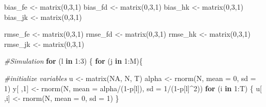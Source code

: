 \documentclass[
]{article}
\newenvironment{Shaded}{\begin{snugshade}}{\end{snugshade}}
\newcommand{\AttributeTok}[1]{\textcolor[rgb]{0.77,0.63,0.00}{#1}}
\newcommand{\CommentTok}[1]{\textcolor[rgb]{0.56,0.35,0.01}{\textit{#1}}}
\newcommand{\ConstantTok}[1]{\textcolor[rgb]{0.00,0.00,0.00}{#1}}
\newcommand{\ControlFlowTok}[1]{\textcolor[rgb]{0.13,0.29,0.53}{\textbf{#1}}}
\newcommand{\DecValTok}[1]{\textcolor[rgb]{0.00,0.00,0.81}{#1}}
\newcommand{\FunctionTok}[1]{\textcolor[rgb]{0.00,0.00,0.00}{#1}}
\newcommand{\NormalTok}[1]{#1}
\newcommand{\OtherTok}[1]{\textcolor[rgb]{0.56,0.35,0.01}{#1}}
\newcommand{\SpecialCharTok}[1]{\textcolor[rgb]{0.00,0.00,0.00}{#1}}
\begin{document}
\begin{Shaded}
\begin{Highlighting}[]
\NormalTok{bias\_fe }\OtherTok{\textless{}{-}} \FunctionTok{matrix}\NormalTok{(}\DecValTok{0}\NormalTok{,}\DecValTok{3}\NormalTok{,}\DecValTok{1}\NormalTok{)}
\NormalTok{bias\_fd }\OtherTok{\textless{}{-}} \FunctionTok{matrix}\NormalTok{(}\DecValTok{0}\NormalTok{,}\DecValTok{3}\NormalTok{,}\DecValTok{1}\NormalTok{)}
\NormalTok{bias\_hk }\OtherTok{\textless{}{-}} \FunctionTok{matrix}\NormalTok{(}\DecValTok{0}\NormalTok{,}\DecValTok{3}\NormalTok{,}\DecValTok{1}\NormalTok{)}
\NormalTok{bias\_jk }\OtherTok{\textless{}{-}} \FunctionTok{matrix}\NormalTok{(}\DecValTok{0}\NormalTok{,}\DecValTok{3}\NormalTok{,}\DecValTok{1}\NormalTok{)}

\NormalTok{rmse\_fe }\OtherTok{\textless{}{-}} \FunctionTok{matrix}\NormalTok{(}\DecValTok{0}\NormalTok{,}\DecValTok{3}\NormalTok{,}\DecValTok{1}\NormalTok{)}
\NormalTok{rmse\_fd }\OtherTok{\textless{}{-}} \FunctionTok{matrix}\NormalTok{(}\DecValTok{0}\NormalTok{,}\DecValTok{3}\NormalTok{,}\DecValTok{1}\NormalTok{)}
\NormalTok{rmse\_hk }\OtherTok{\textless{}{-}} \FunctionTok{matrix}\NormalTok{(}\DecValTok{0}\NormalTok{,}\DecValTok{3}\NormalTok{,}\DecValTok{1}\NormalTok{)}
\NormalTok{rmse\_jk }\OtherTok{\textless{}{-}} \FunctionTok{matrix}\NormalTok{(}\DecValTok{0}\NormalTok{,}\DecValTok{3}\NormalTok{,}\DecValTok{1}\NormalTok{)}

\CommentTok{\#Simulation}
\ControlFlowTok{for}\NormalTok{ (l }\ControlFlowTok{in} \DecValTok{1}\SpecialCharTok{:}\DecValTok{3}\NormalTok{) \{}
  \ControlFlowTok{for}\NormalTok{ (j }\ControlFlowTok{in} \DecValTok{1}\SpecialCharTok{:}\NormalTok{M)\{}
    
    \CommentTok{\#initialize variables}
\NormalTok{    u }\OtherTok{\textless{}{-}} \FunctionTok{matrix}\NormalTok{(}\ConstantTok{NA}\NormalTok{, N, T)}
\NormalTok{    alpha }\OtherTok{\textless{}{-}} \FunctionTok{rnorm}\NormalTok{(N, }\AttributeTok{mean =} \DecValTok{0}\NormalTok{, }\AttributeTok{sd =} \DecValTok{1}\NormalTok{)}
\NormalTok{    y[ ,}\DecValTok{1}\NormalTok{] }\OtherTok{\textless{}{-}} \FunctionTok{rnorm}\NormalTok{(N, }\AttributeTok{mean =}\NormalTok{ alpha}\SpecialCharTok{/}\NormalTok{(}\DecValTok{1}\SpecialCharTok{{-}}\NormalTok{p[l]), }\AttributeTok{sd =} \DecValTok{1}\SpecialCharTok{/}\NormalTok{(}\DecValTok{1}\SpecialCharTok{{-}}\NormalTok{p[l]}\SpecialCharTok{\^{}}\DecValTok{2}\NormalTok{))}
    \ControlFlowTok{for}\NormalTok{ (i }\ControlFlowTok{in} \DecValTok{1}\SpecialCharTok{:}\NormalTok{T) \{}
\NormalTok{      u[ ,i] }\OtherTok{\textless{}{-}} \FunctionTok{rnorm}\NormalTok{(N, }\AttributeTok{mean =} \DecValTok{0}\NormalTok{, }\AttributeTok{sd =} \DecValTok{1}\NormalTok{)}
\NormalTok{    \}}
    

\end{Highlighting}
\end{Shaded}
\end{document}
